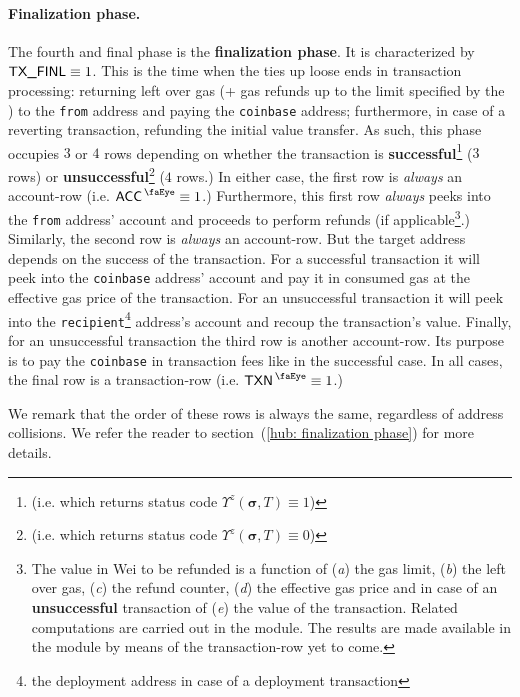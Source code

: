 \paragraph*{Finalization phase.}
The fourth and final phase is the \textbf{finalization phase}.
It is characterized by $\textsf{TX}\textsf{\_FINL} \equiv 1$.
This is the time when the \zkEvm{} ties up loose ends in transaction processing:
returning left over gas (+ gas refunds up to the limit specified by the \cite{EYP}) to the \texttt{from} address and paying the \texttt{coinbase} address;
furthermore, in case of a reverting transaction, refunding the initial value transfer.
As such, this phase occupies $3$ or $4$ rows depending on whether the transaction is
\textbf{successful}\footnote{(i.e. which returns status code $\Upsilon^{z}(\bm{\sigma}, T) \equiv 1$)} ($3$ rows) or
\textbf{unsuccessful}\footnote{(i.e. which returns status code $\Upsilon^{z}(\bm{\sigma}, T) \equiv 0$)} ($4$ rows.)
In either case, the first row is \emph{always} an account-row (i.e. $\peekAccount \equiv 1$.)
Furthermore, this first row \emph{always} peeks into the \texttt{from} address' account and proceeds to perform refunds
(if applicable\footnote{The value in Wei to be refunded is a function of
(\emph{a}) the gas limit,
(\emph{b}) the left over gas,
(\emph{c}) the refund counter,
(\emph{d}) the effective gas price and in case of an \textbf{unsuccessful} transaction of
(\emph{e}) the value of the transaction.
Related computations are carried out in the \txnDataMod{} module.
The results are made available in the \hubMod{} module by means of the transaction-row yet to come.}.)
Similarly, the second row is \emph{always} an account-row.
But the target address depends on the success of the transaction.
For a successful transaction it will peek into the \texttt{coinbase} address' account and pay it in consumed gas at the effective gas price of the transaction.
For an unsuccessful transaction it will peek into the \texttt{recipient}\footnote{the deployment address in case of a deployment transaction} address's account
and recoup the transaction's value.
Finally, for an unsuccessful transaction the third row is another account-row.
Its purpose is to pay the \texttt{coinbase} in transaction fees like in the successful case.
In all cases, the final row is a transaction-row (i.e. $\peekTransaction \equiv 1$.)

\saNote{}
We remark that the order of these rows is always the same, regardless of address collisions.
We refer the reader to section~(\ref{hub: finalization phase}) for more details.

